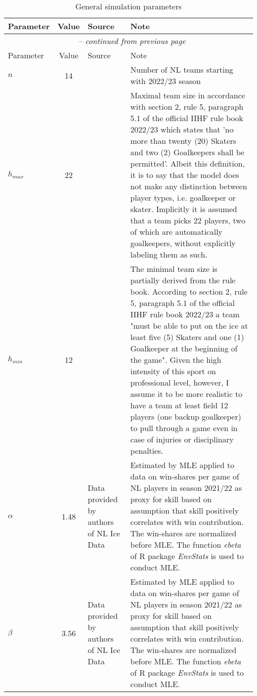 \renewcommand*{\arraystretch}{1.5}
\begin{longtable}[h!]{lc>{\baselineskip=15pt}p{4cm}>{\baselineskip=15pt}p{6cm}}

    \caption{General simulation parameters}
    \label{table:params} \\

    \toprule
    Parameter& Value & Source & Note \\
    \midrule
    \endfirsthead

    \multicolumn{4}{c}{{{\bfseries \tablename\ \thetable{}} -- \textit{continued from previous page}}}\\
    \toprule
    Parameter& Value & Source & Note \\
    \midrule
    \endhead

    
    $n$  & 14 &  & Number of NL teams starting with 2022/23 season \\
    $h_{max}$ & 22 & \citet[][p. ~ 39]{iihf_iihf_2022-1} & Maximal team size in accordance with section 2, rule 5, paragraph 5.1 of the official IIHF rule book 2022/23 which states that 'no more than twenty (20) Skaters and two (2) Goalkeepers shall be permitted'. Albeit this definition, it is to say that the model does not make any distinction between player types, i.e. goalkeeper or skater. Implicitly it is assumed that a team picks 22 players, two of which are automatically goalkeepers, without explicitly labeling them as such. \\
    $h_{min}$ & 12 & \citet[][p. ~ 39]{iihf_iihf_2022-1} & The minimal team size is partially derived from the rule book. According to section 2, rule 5, paragraph 5.1 of the official IIHF rule book 2022/23 a team "must be able to put on the ice at least five (5) Skaters and one (1) Goalkeeper at the beginning of the game". Given the high intensity of this sport on professional level, however, I assume it to be more realistic to have a team at least field 12 players (one backup goalkeeper) to pull through a game even in case of injuries or disciplinary penalties.  \\
    $\alpha$  & 1.48 & Data provided by authors of NL Ice Data & Estimated by MLE applied to data on win-shares per game of NL players in season 2021/22 as proxy for skill based on assumption that skill positively correlates with win contribution. The win-shares are normalized before MLE. The function \emph{ebeta} of R package \emph{EnvStats} is used to conduct MLE. \\
    $\beta$  & 3.56 & Data provided by authors of NL Ice Data & Estimated by MLE applied to data on win-shares per game of NL players in season 2021/22 as proxy for skill based on assumption that skill positively correlates with win contribution. The win-shares are normalized before MLE. The function \emph{ebeta} of R package \emph{EnvStats} is used to conduct MLE. \\

\end{longtable}
